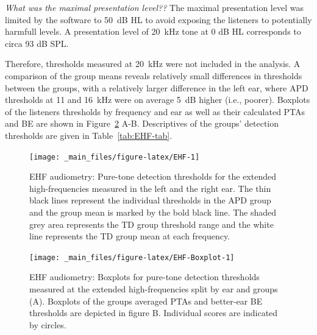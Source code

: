 \documentclass[a4paper, twoside]{templates/ociamthesis}
\begin{document}
\begin{correction}
\emph{What was the maximal presentation level?? } The maximal
presentation level was limited by the software to 50~dB HL to avoid
exposing the listeners to potentially harmfull levels. A presentation
level of 20~kHz tone at 0 dB HL corresponds to circa 93 dB SPL.
\end{correction}

Therefore, thresholds measured at 20~kHz were not included in the analysis. A comparison of the group means reveals relatively small differences in thresholds between the groups, with a relatively larger difference in the left ear, where APD thresholds at 11 and 16~kHz were on average 5~dB higher (i.e., poorer). Boxplots of the listeners thresholds by frequency and ear as well as their calculated PTAs and BE are shown in Figure~\ref{fig:EHF-Boxplot} A-B. Descriptives of the groups' detection thresholds are given in Table~\ref{tab:EHF-tab}.\\

\begin{figure}

{\centering \texttt{[image: \_main\_files/figure-latex/EHF-1]} 

}

\caption{EHF audiometry: Pure-tone detection thresholds for the extended high-frequencies measured in the left and the right ear. The thin black lines represent the individual thresholds in the APD group and the group mean is marked by the bold black line. The shaded grey area represents the TD group threshold range and the white line represents the TD group mean at each frequency.}\label{fig:EHF}
\end{figure}

\begin{figure}

{\centering \texttt{[image: \_main\_files/figure-latex/EHF-Boxplot-1]} 

}

\caption{EHF audiometry: Boxplots for pure-tone detection thresholds measured at the extended high-frequencies split by ear and groups (A). Boxplots of the groups averaged PTAs and better-ear BE thresholds are depicted in figure B. Individual scores are indicated by circles.}\label{fig:EHF-Boxplot}
\end{figure}
\end{document}
